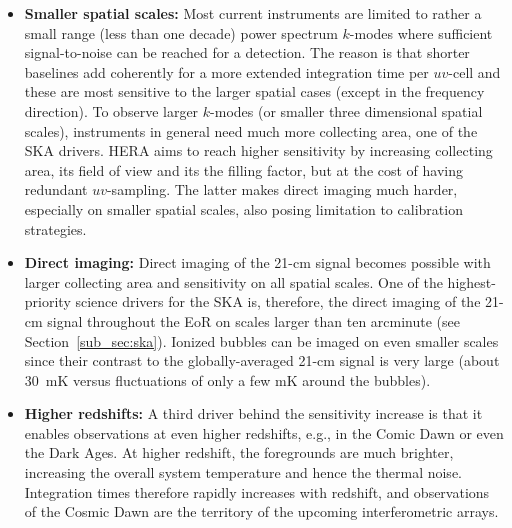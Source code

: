 \begin{itemize}
  
\item {\bf Smaller spatial scales:} Most current instruments are limited to rather a small range (less than one decade) power spectrum $k$-modes where sufficient signal-to-noise can be reached for a detection. The reason is that shorter baselines add coherently for a more extended integration time per $uv$-cell and these are most sensitive to the larger spatial cases (except in the frequency direction). To observe larger $k$-modes (or smaller three dimensional spatial scales), instruments in general need much more collecting area, one of the SKA drivers. HERA aims to reach higher sensitivity by  increasing collecting area, its field of view and its the filling factor, but at the cost of having redundant $uv$-sampling. The latter makes direct imaging much harder, especially on smaller spatial scales, also posing limitation to calibration strategies. 
    
\item {\bf Direct imaging:} Direct imaging of the 21-cm signal becomes possible with larger collecting area and sensitivity on all spatial scales. One of the highest-priority science drivers for the SKA is, therefore, the direct imaging  of the 21-cm signal throughout the EoR on scales larger than ten arcminute (see Section~\ref{sub_sec:ska}). Ionized bubbles can be imaged on even smaller scales since their contrast to the globally-averaged 21-cm signal is very large (about 30~mK versus fluctuations of only a few mK around the bubbles). 

\item {\bf Higher redshifts:} A third driver behind the sensitivity increase is that it enables observations at even higher redshifts, e.g., in the Comic Dawn or even the Dark Ages. At higher redshift, the foregrounds are much brighter, increasing the overall system temperature and hence the thermal noise. Integration times therefore rapidly increases with redshift, and observations of the Cosmic Dawn are the territory of the upcoming interferometric arrays.
\end{itemize}

